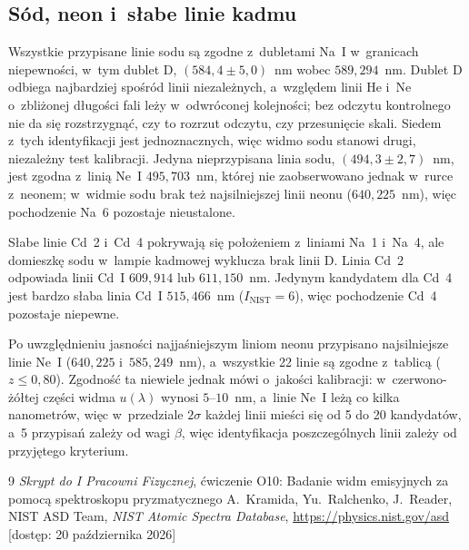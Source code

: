 \documentclass[12pt, a4paper]{article}
\begin{document}
\subsection{Sód, neon i~słabe linie kadmu}

Wszystkie przypisane linie sodu są zgodne z~dubletami Na~I w~granicach niepewności,
w~tym dublet D, $(584{,}4 \pm 5{,}0)$~nm wobec $589{,}294$~nm. Dublet D odbiega najbardziej
spośród linii niezależnych, a~względem linii He i~Ne o~zbliżonej długości fali leży
w~odwróconej kolejności; bez odczytu kontrolnego nie da się rozstrzygnąć, czy to rozrzut
odczytu, czy przesunięcie skali. Siedem z~tych
identyfikacji jest jednoznacznych, więc widmo sodu stanowi drugi, niezależny test
kalibracji. Jedyna nieprzypisana linia sodu, $(494{,}3 \pm 2{,}7)$~nm, jest zgodna
z~linią Ne~I $495{,}703$~nm, której nie zaobserwowano jednak w~rurce z~neonem; w~widmie
sodu brak też najsilniejszej linii neonu ($640{,}225$~nm), więc pochodzenie Na~6
pozostaje nieustalone.

Słabe linie Cd~2 i~Cd~4 pokrywają się położeniem z~liniami Na~1 i~Na~4, ale domieszkę sodu
w~lampie kadmowej wyklucza brak linii D. Linia Cd~2 odpowiada linii Cd~I $609{,}914$ lub $611{,}150$~nm. Jedynym
kandydatem dla Cd~4 jest bardzo słaba linia Cd~I $515{,}466$~nm ($I_\text{NIST} = 6$),
więc pochodzenie Cd~4 pozostaje niepewne.

Po uwzględnieniu jasności najjaśniejszym liniom neonu przypisano najsilniejsze linie Ne~I
($640{,}225$ i~$585{,}249$~nm), a~wszystkie 22 linie są zgodne z~tablicą ($z \leq 0{,}80$).
Zgodność ta niewiele jednak mówi o~jakości kalibracji: w~czerwono-żółtej części widma
$u(\lambda)$ wynosi $5$--$10$~nm, a~linie Ne~I leżą co kilka nanometrów, więc w~przedziale
$2\sigma$ każdej linii mieści się od 5 do 20 kandydatów, a~5 przypisań zależy od wagi $\beta$,
więc identyfikacja poszczególnych linii zależy od przyjętego kryterium.

\begin{thebibliography}{9}
    \textit{Skrypt do I Pracowni Fizycznej}, ćwiczenie O10:
    Badanie widm emisyjnych za pomocą spektroskopu pryzmatycznego
    A.~Kramida, Yu.~Ralchenko, J.~Reader, NIST ASD Team,
    \textit{NIST Atomic Spectra Database},
    \url{https://physics.nist.gov/asd} [dostęp: 20 października 2026]
\end{thebibliography}
\end{document}
